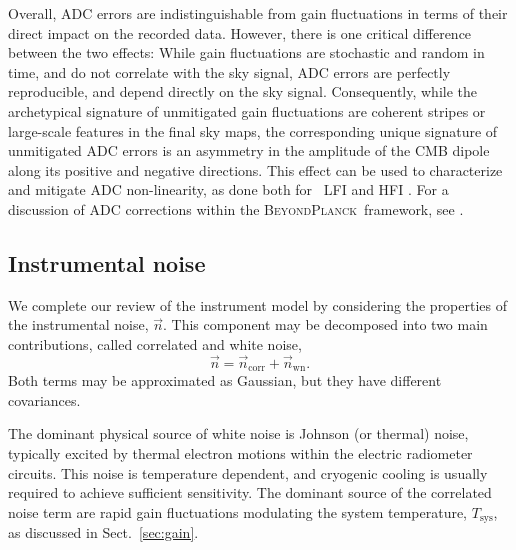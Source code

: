 \documentclass[twocolumn]{aa}
\newcommand{\n}[0]{\vec{n}}
\newcommand{\BP}{\textsc{BeyondPlanck}}
\begin{document}
Overall, ADC errors are indistinguishable from gain fluctuations in
terms of their direct impact on the recorded data. However, there is
one critical difference between the two effects: While gain
fluctuations are stochastic and random in time, and do not correlate
with the sky signal, ADC errors are perfectly reproducible, and depend
directly on the sky signal. Consequently, while the archetypical
signature of unmitigated gain fluctuations are coherent stripes or
large-scale features in the final sky maps, the corresponding unique
signature of unmitigated ADC errors is an asymmetry in the amplitude
of the CMB dipole along its positive and negative directions. This
effect can be used to characterize and mitigate ADC non-linearity, as
done both for \Planck\ LFI and HFI
\citep{planck2016-l02,planck2016-l03,planck2020-LVII}. For a
discussion of ADC corrections within the \BP\ framework, see
\citet{bp25}.

\subsection{Instrumental noise}
\label{sec:noise}

We complete our review of the instrument model by considering the
properties of the instrumental noise, $\n$. This component may be
decomposed into two main contributions, called correlated and white
noise,
\begin{equation}
  \n = \n_{\mathrm{corr}} + \n_{\mathrm{wn}}.
  \label{eq:noise}
\end{equation}
Both terms may be approximated as Gaussian, but they have different
covariances.

The dominant physical source of white noise is Johnson (or thermal)
noise, typically excited by thermal electron motions within the
electric radiometer circuits. This noise is temperature dependent, and
cryogenic cooling is usually required to achieve sufficient
sensitivity. The dominant source of the correlated noise term are
rapid gain fluctuations modulating the system temperature,
$T_{\mathrm{sys}}$, as discussed in Sect.~\ref{sec:gain}.
\end{document}
